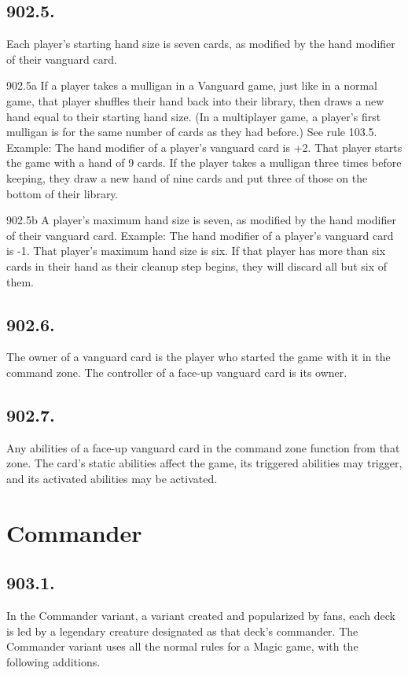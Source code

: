 \subsection*{902.5.}
Each player’s starting hand size is seven cards, as modified by the hand modifier of their vanguard card.

902.5a If a player takes a mulligan in a Vanguard game, just like in a normal game, that player shuffles their hand back into their library, then draws a new hand equal to their starting hand size. (In a multiplayer game, a player’s first mulligan is for the same number of cards as they had before.) See rule 103.5.
Example: The hand modifier of a player’s vanguard card is +2. That player starts the game with a hand of 9 cards. If the player takes a mulligan three times before keeping, they draw a new hand of nine cards and put three of those on the bottom of their library.

902.5b A player’s maximum hand size is seven, as modified by the hand modifier of their vanguard card.
Example: The hand modifier of a player’s vanguard card is -1. That player’s maximum hand size is six. If that player has more than six cards in their hand as their cleanup step begins, they will discard all but six of them.

\subsection*{902.6.}
The owner of a vanguard card is the player who started the game with it in the command zone. The controller of a face-up vanguard card is its owner.

\subsection*{902.7.}
Any abilities of a face-up vanguard card in the command zone function from that zone. The card’s static abilities affect the game, its triggered abilities may trigger, and its activated abilities may be activated.

\section{Commander}
\subsection*{903.1.}
In the Commander variant, a variant created and popularized by fans, each deck is led by a legendary creature designated as that deck’s commander. The Commander variant uses all the normal rules for a Magic game, with the following additions.

